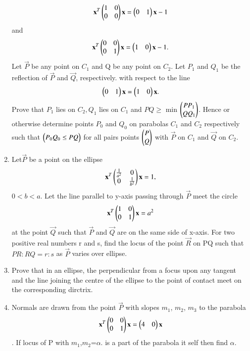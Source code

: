 \begin{enumerate}[label=\arabic*.,ref=\thesubsection.\theenumi]
    \begin{align}
    \mathbf{x}^T\begin{pmatrix}1&0\\0&0\end{pmatrix}\mathbf{x}=\begin{pmatrix}0&1\end{pmatrix}\mathbf{x}-1
    \end{align} and
    \begin{align}
    \mathbf{x}^T\begin{pmatrix}0&0\\0&1\end{pmatrix}\mathbf{x}=\begin{pmatrix}1&0\end{pmatrix}\mathbf{x}-1.
    \end{align} Let $\vec{P}$ be any point on $C_1$ and Q be any point on $C_2$. Let $P_1$ and 
    $Q_1$ be the reflection of $\vec{P}$ and $\vec{Q}$, respectively. with respect to the line 
    \begin{align}
    \begin{pmatrix}0&1\end{pmatrix}\mathbf{x}=\begin{pmatrix}1&0\end{pmatrix}\mathbf{x}.
    \end{align} Prove that $P_1$ lies on $C_2, Q_1$ lies on $C_1$ and $P Q \geq$ min 
    $\begin{pmatrix}PP_1\\QQ_1\end{pmatrix}$. Hence or otherwise determine points $P_0$ and $Q_0$ on parabolas $C_1$ and 		$C_2$ respectively such that $\begin{pmatrix}P_0 Q_0 \leq PQ\end{pmatrix}$ for all pairs points $\begin{pmatrix}P\\Q\end{pmatrix}$ with 
    $\vec{P}$ on $C_1$ and $\vec{Q}$ on $C_2$.
    \item Let$\vec{P}$ be a point on the ellipse
    \begin{align}
    \mathbf{x}^T\begin{pmatrix}\frac{1}{a^2}&0\\0&\frac{1}{b^2}\end{pmatrix}\mathbf{x}=1,
    \end{align} $0<b<a$. Let the line parallel to y-axis passing through $\vec{P}$ meet the circle
    \begin{align}
    \mathbf{x}^T\begin{pmatrix}1&0\\0&1\end{pmatrix}\mathbf{x}=a^2
    \end{align} at the point $\vec{Q}$ such that $\vec{P}$ and $\vec{Q}$ are on the same side of 
    x-axis. For two positive real numbers r and s, find the locus of the point $\vec{R}$ on 
    PQ such that $PR:RQ=r:s$ as $\vec{P}$ varies over ellipse.
    \item Prove that in an ellipse, the perpendicular from a focus upon any tangent and the line joining the centre of the ellipse to the point of contact meet on the corresponding dirctrix.
    \item Normals are drawn from the point $\vec{P}$ with slopes $m_1$, $m_2$, $m_3$ to the parabola
    \begin{align}
    \mathbf{x}^T\begin{pmatrix}0&0\\0&1\end{pmatrix}\mathbf{x}=\begin{pmatrix}4&0\end{pmatrix}\mathbf{x}
    \end{align}. If locus of P with $m_1$,$m_2$=$\alpha$. is a part of the parabola it self then find $\alpha$.

\end{enumerate}
